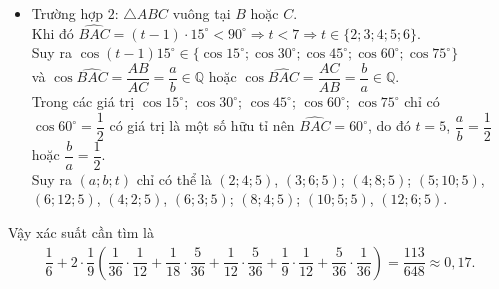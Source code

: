\begin{ex}
{\begin{itemize}
			\item Trường hợp $2$: $\triangle ABC$ vuông tại $B$ hoặc $C$.\\
			Khi đó $\widehat{BAC}=(t-1)\cdot 15^\circ<90^\circ\Rightarrow t<7\Rightarrow t\in \{2;3;4;5;6\}$.\\
			Suy ra $\cos (t-1)15^\circ\in \{\cos 15^\circ;\cos 30^\circ;\cos 45^\circ;\cos 60^\circ;\cos 75^\circ\}$\\
			và $\cos \widehat{BAC}=\dfrac{AB}{AC}=\dfrac{a}{b}\in \mathbb{Q}$ hoặc $\cos \widehat{BAC}=\dfrac{AC}{AB}=\dfrac{b}{a}\in \mathbb{Q}$.\\
			Trong các giá trị $\cos 15^\circ$; $\cos 30^\circ$; $\cos 45^\circ$; $\cos 60^\circ$; $\cos 75^\circ$ chỉ có $\cos 60^\circ=\dfrac{1}{2}$ có giá trị là một số hữu tỉ nên  $\widehat{BAC}=60^\circ$, do đó $t=5$, $\dfrac{a}{b}=\dfrac{1}{2}$ hoặc $\dfrac{b}{a}=\dfrac{1}{2}$.\\
			Suy ra $(a;b;t)$ chỉ có thể là $(2;4;5)$, $(3;6;5)$; $(4;8;5)$; $(5;10;5)$, $(6;12;5)$, $(4;2;5)$, $(6;3;5)$; $(8;4;5)$; $(10;5;5)$, $(12;6;5)$.
		\end{itemize}
		Vậy xác suất cần tìm là
		\begin{align*}
			\dfrac{1}{6}+2\cdot \dfrac{1}{9} \left(\dfrac{1}{36}\cdot \dfrac{1}{12}+\dfrac{1}{18}\cdot \dfrac{5}{36}+\dfrac{1}{12}\cdot \dfrac{5}{36}+\dfrac{1}{9}\cdot \dfrac{1}{12}+\dfrac{5}{36}\cdot \dfrac{1}{36}\right)=\dfrac{113}{648}\approx 0{,}17. 
		\end{align*}
	}
\end{ex}

